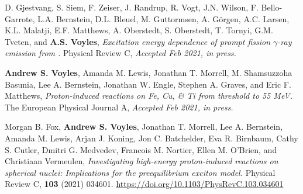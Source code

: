 \begin{bibsection}

\item D. Gjestvang, S. Siem, F. Zeiser, J. Randrup, R. Vogt, J.N. Wilson, F. Bello-Garrote, L.A. Bernstein, D.L. Bleuel, M. Guttormsen, A. Görgen, A.C. Larsen, K.L. Malatji, E.F. Matthews, A. Oberstedt, S. Oberstedt, T. Tornyi, G.M. Tveten, and \textbf{A.S. Voyles}, \emph{Excitation energy dependence of prompt fission $\gamma$-ray emission from  .} Physical Review C, \emph{Accepted Feb 2021, in press. }
% 

\item \textbf{Andrew S. Voyles}, Amanda M. Lewis, Jonathan T. Morrell, M. Shamsuzzoha Basunia, Lee A. Bernstein, Jonathan W. Engle, Stephen A. Graves, and Eric F. Matthews, \emph{Proton-induced reactions on Fe, Cu, \& Ti from threshold to 55 MeV.} The European Physical Journal A, \emph{Accepted Feb 2021, in press. }
% 


\item Morgan B. Fox, \textbf{Andrew S. Voyles}, Jonathan T. Morrell, Lee A. Bernstein, Amanda M. Lewis, Arjan J. Koning, Jon C. Batchelder, Eva R. Birnbaum, Cathy S. Cutler, Dmitri G. Medvedev, Francois M. Nortier, Ellen M. O’Brien, and Christiaan Vermeulen, \emph{Investigating high-energy proton-induced reactions on spherical nuclei: Implications for the preequilibrium exciton model.} Physical Review C, \textbf{103} (2021) 034601. \url{https://doi.org/10.1103/PhysRevC.103.034601} 


\end{bibsection}
